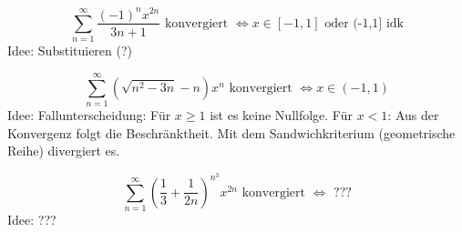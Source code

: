 \begin{displaymath}
  \sum_{n = 1}^{\infty} \frac{(-1)^n x^{2n}}{3n+1} \text{ konvergiert } \iff x \in [-1,1] \text{ oder (-1,1] idk}
\end{displaymath}
Idee: Substituieren (?)

\begin{displaymath}
  \sum_{n = 1}^{\infty} (\sqrt{n^2-3n} - n) x^n \text{ konvergiert } \iff x \in (-1,1)
\end{displaymath}
Idee: Fallunterscheidung: Für $x \geq 1$ ist es keine Nullfolge. Für $x < 1$: Aus der Konvergenz folgt die Beschränktheit. Mit dem Sandwichkriterium (geometrische Reihe) divergiert es.

\begin{displaymath}
  \sum_{n = 1}^{\infty} \left(\frac{1}{3} + \frac{1}{2n}\right)^{n^3} x^{2n} \text{ konvergiert } \iff \text{ ???}
\end{displaymath}
Idee: ???
